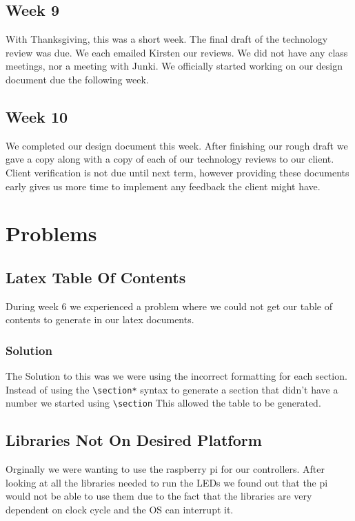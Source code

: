 \documentclass[onecolumn, draftclsnofoot,10pt, compsoc]{IEEEtran}
\begin{document}
		\subsection{Week 9}
		With Thanksgiving, this was a short week. The final draft of the technology review was due. We each emailed Kirsten our reviews.
		We did not have any class meetings, nor a meeting with Junki.
		We officially started working on our design document due the following week.

		\subsection{Week 10}
		We completed our design document this week. After finishing our rough draft we gave a copy along with a copy of each of our technology reviews to our client.
		Client verification is not due until next term, however providing these documents early gives us more time to implement any feedback the client might have.

		\section{Problems}
			\subsection{Latex Table Of Contents}
			During week 6 we experienced a problem where we could not get our table
			of contents to generate in our latex documents.
				\subsubsection{Solution}
				The Solution to this was we were using the incorrect formatting for each
				section. Instead of using the \verb|\section*| syntax to generate a section that
				didn't have a number we started using \verb|\section| This allowed the table
				to be generated.
			\subsection{Libraries Not On Desired Platform}
      Orginally we were wanting to use the raspberry pi for our controllers. After
      looking at all the libraries needed to run the LEDs we found out that the
      pi would not be able to use them due to the fact that the libraries are very
      dependent on clock cycle and the OS can interrupt it.
\end{document}
